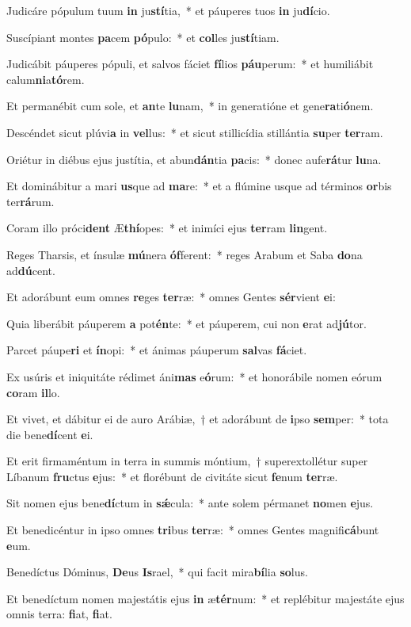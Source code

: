 \item Judicáre pópulum tuum \textbf{in} ju\textbf{stí}tia,~* et páuperes tuos \textbf{in} ju\textbf{dí}cio.
\item Suscípiant montes \textbf{pa}cem \textbf{pó}pulo:~* et \textbf{col}les ju\textbf{stí}tiam.
\item Judicábit páuperes pópuli, et salvos fáciet \textbf{fí}lios \textbf{páu}perum:~* et humiliábit calum\textbf{ni}a\textbf{tó}rem.
\item Et permanébit cum sole, et \textbf{an}te \textbf{lu}nam,~* in generatióne et gene\textbf{ra}ti\textbf{ó}nem.
\item Descéndet sicut plúvi\textbf{a} in \textbf{vel}lus:~* et sicut stillicídia stillántia \textbf{su}per \textbf{ter}ram.
\item Oriétur in diébus ejus justítia, et abun\textbf{dán}tia \textbf{pa}cis:~* donec aufe\textbf{rá}tur \textbf{lu}na.
\item Et dominábitur a mari \textbf{us}que ad \textbf{ma}re:~* et a flúmine usque ad términos \textbf{or}bis ter\textbf{rá}rum.
\item Coram illo próci\textbf{dent} Æ\textbf{thí}opes:~* et inimíci ejus \textbf{ter}ram \textbf{lin}gent.
\item Reges Tharsis, et ínsulæ \textbf{mú}nera \textbf{óf}ferent:~* reges Arabum et Saba \textbf{do}na ad\textbf{dú}cent.
\item Et adorábunt eum omnes \textbf{re}ges \textbf{ter}ræ:~* omnes Gentes \textbf{sér}vient \textbf{e}i:
\item Quia liberábit páuperem \textbf{a} pot\textbf{én}te:~* et páuperem, cui non \textbf{e}rat ad\textbf{jú}tor.
\item Parcet páupe\textbf{ri} et \textbf{ín}opi:~* et ánimas páuperum \textbf{sal}vas \textbf{fá}ciet.
\item Ex usúris et iniquitáte rédimet áni\textbf{mas} e\textbf{ó}rum:~* et honorábile nomen eórum \textbf{co}ram \textbf{il}lo.
\item Et vivet, et dábitur ei de auro Arábiæ,~† et adorábunt de \textbf{i}pso \textbf{sem}per:~* tota die bene\textbf{dí}cent \textbf{e}i.
\item Et erit firmaméntum in terra in summis móntium,~† superextollétur super Líbanum \textbf{fru}ctus \textbf{e}jus:~* et florébunt de civitáte sicut \textbf{fe}num \textbf{ter}ræ.
\item Sit nomen ejus bene\textbf{dí}ctum in \textbf{sǽ}cula:~* ante solem pérmanet \textbf{no}men \textbf{e}jus.
\item Et benedicéntur in ipso omnes \textbf{tri}bus \textbf{ter}ræ:~* o\-mnes Gentes magnifi\textbf{cá}bunt \textbf{e}um.
\item Benedíctus Dóminus, \textbf{De}us \textbf{Is}rael,~* qui facit mira\textbf{bí}lia \textbf{so}lus.
\item Et benedíctum nomen majestátis ejus \textbf{in} æ\textbf{tér}num:~* et replébitur maje\-státe ejus o\-mnis terra: \textbf{fi}at, \textbf{fi}at.
